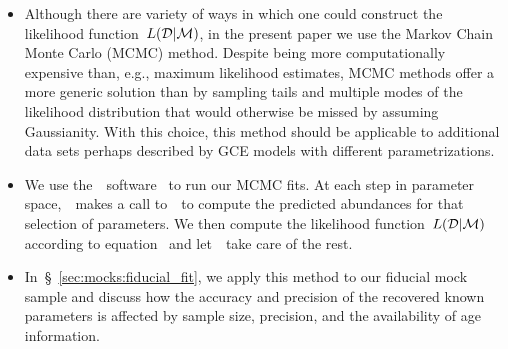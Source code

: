 \documentclass[ms.tex]{subfiles}
\begin{document}
\begin{itemize}
	\item Although there are variety of ways in which one could construct the
	likelihood function~$L(\mathcal{D} | \mathcal{M})$, in the present paper we
	use the Markov Chain Monte Carlo (MCMC) method.
	Despite being more computationally expensive than, e.g., maximum likelihood
	estimates, MCMC methods offer a more generic solution than by sampling
	tails and multiple modes of the likelihood distribution that would
	otherwise be missed by assuming Gaussianity.
	With this choice, this method should be applicable to additional data sets
	perhaps described by GCE models with different parametrizations.

	\item We use the~\mc~software~\citep{Foreman-Mackey2013} to run our MCMC
	fits.
	At each step in parameter space,~\mc~makes a call to~\vice~to compute the
	predicted abundances for that selection of parameters.
	We then compute the likelihood function~$L(\mathcal{D} | \mathcal{M})$
	according to equation~ and let~\mc~take care of
	the rest.

	\item In~\S~\ref{sec:mocks:fiducial_fit}, we apply this method to our
	fiducial mock sample and discuss how the accuracy and precision of the
	recovered known parameters is affected by sample size, precision, and
	the availability of age information.

\end{itemize}
\end{document}
